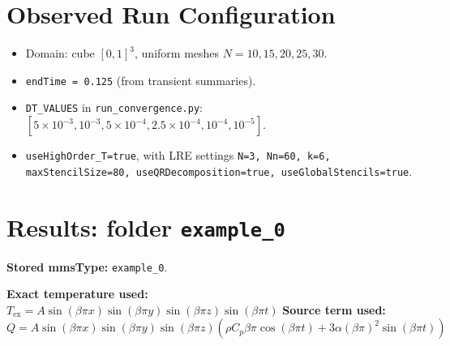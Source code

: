 \documentclass[11pt,a4paper]{article}
\begin{document}
\section{Observed Run Configuration}
\begin{itemize}
\item Domain: cube $[0,1]^3$, uniform meshes $N=10,15,20,25,30$.
\item \texttt{endTime = 0.125} (from transient summaries).
\item \texttt{DT\_VALUES} in \texttt{run\_convergence.py}: $[5\times10^{-3},10^{-3},5\times10^{-4},2.5\times10^{-4},10^{-4},10^{-5}]$.
\item \texttt{useHighOrder\_T=true}, with LRE settings \texttt{N=3, Nn=60, k=6, maxStencilSize=80, useQRDecomposition=true, useGlobalStencils=true}.
\end{itemize}
\section{Results: folder \texttt{example\_0}}
\textbf{Stored mmsType:} \texttt{example\_0}.

\textbf{Exact temperature used:} $T_{\mathrm{ex}} = A\sin(\beta\pi x)\sin(\beta\pi y)\sin(\beta\pi z)\sin(\beta\pi t)$
\textbf{Source term used:} $Q = A\sin(\beta\pi x)\sin(\beta\pi y)\sin(\beta\pi z)\left(\rho C_p\beta\pi\cos(\beta\pi t) + 3\alpha(\beta\pi)^2\sin(\beta\pi t)\right)$
\end{document}
